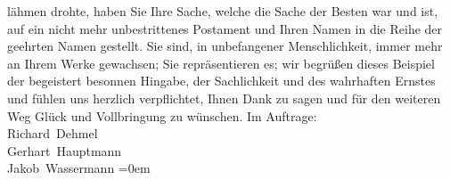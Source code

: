 \begin{ledgroupsized}[t]{13cm}
               lähmen drohte, haben Sie Ihre Sache, welche die Sache der Besten war und ist, auf ein
               nicht mehr unbestrittenes Postament und Ihren Namen in die Reihe der geehrten Namen
               gestellt. Sie sind, in unbefangener Menschlichkeit, immer mehr an Ihrem Werke
               gewachsen; Sie repräsentieren es; wir begrüßen dieses Beispiel der begeistert
               besonnen Hingabe, der Sachlichkeit und des wahrhaften Ernstes und fühlen uns herzlich
               verpflichtet, Ihnen Dank zu sagen und für den weiteren Weg Glück und Vollbringung zu
               wünschen.\pend
           \pstart
           Im Auftrage:{\\[\baselineskip]}\spacefill\mbox{Richard Dehmel}{\\[\baselineskip]}\spacefill\mbox{Gerhart Hauptmann}{\\[\baselineskip]}\spacefill\mbox{Jakob Wassermann}\pend
           \leftskip=0em{}
         
         \endnumbering{}\end{ledgroupsized}  \newcommand{\dateiname}{L01892}\newcommand{\titel}{Richard Dehmel, Gerhart Hauptmann und Jakob Wassermann an Arthur Schnitzler, 3. 12. 1909}\newcommand{\editorInnen}{Martin Anton Müller und Gerd-Hermann Susen}
      